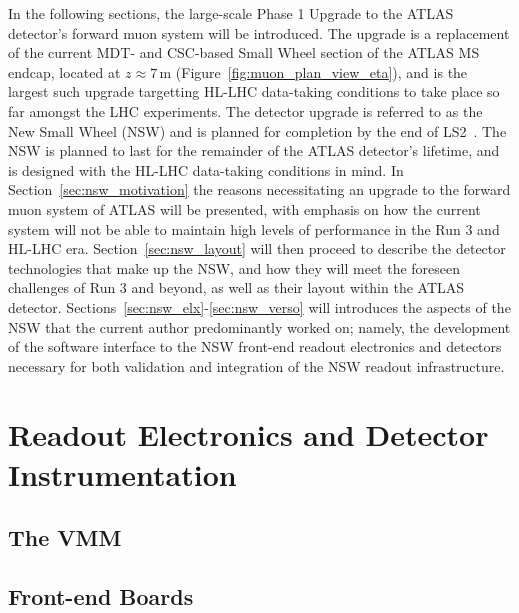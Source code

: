 In the following sections, the large-scale Phase 1 Upgrade to the ATLAS detector's forward muon system
will be introduced.
The upgrade is a replacement of the current MDT- and CSC-based Small Wheel section of the ATLAS MS endcap, located at $z \approx 7$\,m (Figure~\ref{fig:muon_plan_view_eta}),
and is the largest such upgrade targetting HL-LHC data-taking conditions to take place so far amongst the LHC experiments.
The detector upgrade is referred to as the New Small Wheel (NSW) and is planned for completion by
the end of LS2~\cite{NSWTDR}.
The NSW is planned to last for the remainder of the ATLAS detector's lifetime, and is designed with the
HL-LHC data-taking conditions in mind.
In Section~\ref{sec:nsw_motivation} the reasons necessitating an upgrade to the forward muon system
of ATLAS will be presented, with emphasis on how the current system will not be able to maintain high
levels of performance in the Run 3 and HL-LHC era.
Section~\ref{sec:nsw_layout} will then proceed to describe the detector technologies that make up
the NSW, and how they will meet the foreseen challenges of Run 3 and beyond, as well as their layout
within the ATLAS detector.
Sections~\ref{sec:nsw_elx}-\ref{sec:nsw_verso} will introduces the aspects of the NSW that the
current author predominantly worked on; namely, the development of the software interface to the NSW front-end readout
electronics and detectors necessary for both validation and integration of the NSW readout infrastructure.





\section{Readout Electronics and Detector Instrumentation}
\subsection{The VMM}
\subsection{Front-end Boards}

